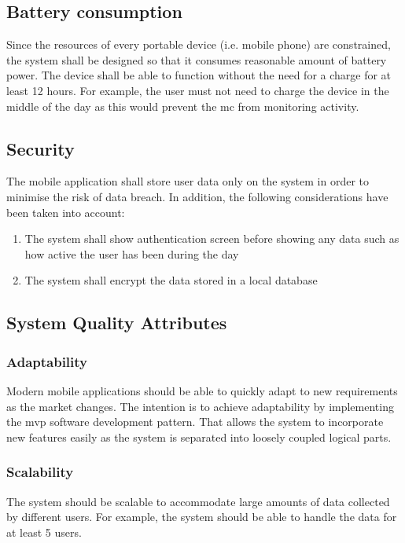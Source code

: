     \subsection{Battery consumption}
    Since the resources of every portable device (i.e. mobile phone) are constrained, the system shall be designed so that it consumes reasonable amount of battery power. The device shall be able to function without the need for a charge for at least 12 hours. For example, the user must not need to charge the device in the middle of the day as this would prevent the \gls{mc} from monitoring activity.
    
    \subsection{Security}
    The mobile application shall store user data only on the system in order to minimise the risk of data breach. In addition, the following considerations have been taken into account:
    
    \begin{enumerate}
        \item The system shall show authentication screen before showing any data such as how active the user has been during the day
        \item The system shall encrypt the data stored in a local database
    \end{enumerate}
    
    \subsection{System Quality Attributes}
    \label{section:system-quality-attributes}
        \subsubsection{Adaptability}
        Modern mobile applications should be able to quickly adapt to new requirements as the market changes. The intention is to achieve adaptability by implementing the \gls{mvp} software development pattern. That allows the system to incorporate new features easily as the system is separated into loosely coupled logical parts.
        
        \subsubsection{Scalability}
        The system should be scalable to accommodate large amounts of data collected by different users. For example, the system should be able to handle the data for at least 5 users.
        
